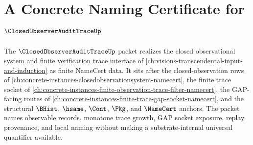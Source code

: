 \chapter{A Concrete Naming Certificate for $\ClosedObserverAuditTraceUp$}
\label{ch:concrete-instances-closed-observer-audit-trace-namecert}

The $\ClosedObserverAuditTraceUp$ packet realizes the closed observational system and finite verification trace interface of \autoref{ch:visions-transcendental-input-and-induction} as finite NameCert data. It sits after the closed-observation rows of \autoref{ch:concrete-instances-closedobservationsystem-namecert}, the finite trace socket of \autoref{ch:concrete-instances-finite-observation-trace-filter-namecert}, the GAP-facing routes of \autoref{ch:concrete-instances-finite-trace-gap-socket-namecert}, and the structural $\BHist$, $\hsame$, $\Cont$, $\Pkg$, and $\NameCert$ anchors. The packet names observable records, monotone trace growth, GAP socket exposure, replay, provenance, and local naming without making a substrate-internal universal quantifier available.

